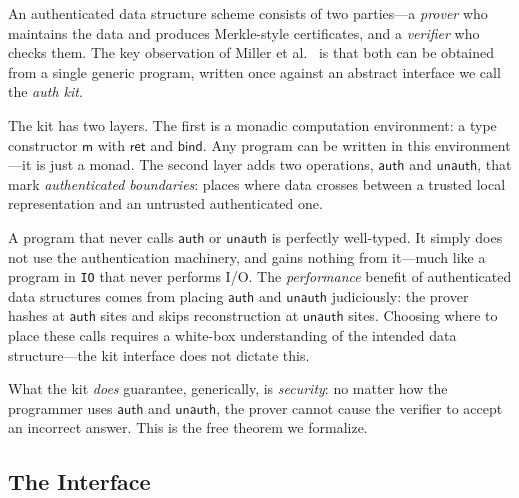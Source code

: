 \documentclass[acmsmall,screen,review,anonymous]{acmart}
\begin{document}
An authenticated data structure scheme consists of two parties---a
\emph{prover} who maintains the data and produces Merkle-style
certificates, and a \emph{verifier} who checks them.  The key
observation of Miller et al.~\cite{miller2014} is that both can be
obtained from a single generic program, written once against an
abstract interface we call the \emph{auth kit}.

The kit has two layers.  The first is a monadic computation
environment: a type constructor $\mathsf{m}$ with $\mathsf{ret}$ and
$\mathsf{bind}$.  Any program can be written in this environment---it
is just a monad.  The second layer adds two operations, $\mathsf{auth}$
and $\mathsf{unauth}$, that mark \emph{authenticated boundaries}: places
where data crosses between a trusted local representation and an
untrusted authenticated one.

A program that never calls $\mathsf{auth}$ or $\mathsf{unauth}$ is
perfectly well-typed.  It simply does not use the authentication
machinery, and gains nothing from it---much like a program in
\texttt{IO} that never performs I/O.  The \emph{performance} benefit of
authenticated data structures comes from placing $\mathsf{auth}$ and
$\mathsf{unauth}$ judiciously: the prover hashes at $\mathsf{auth}$
sites and skips reconstruction at $\mathsf{unauth}$ sites.  Choosing
where to place these calls requires a white-box understanding of the
intended data structure---the kit interface does not dictate this.

What the kit \emph{does} guarantee, generically, is \emph{security}:
no matter how the programmer uses $\mathsf{auth}$ and $\mathsf{unauth}$,
the prover cannot cause the verifier to accept an incorrect answer.
This is the free theorem we formalize.

\subsection{The Interface}
\end{document}
